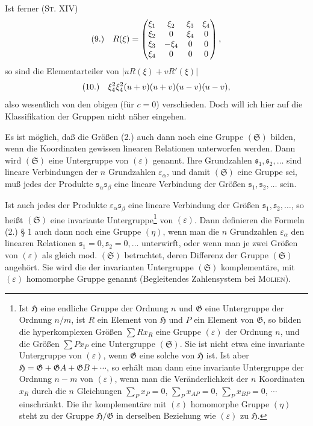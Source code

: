 \documentclass[11pt]{article}
\newcommand{\eps}{\varepsilon}
\newcommand{\fnum}[1]{\textup{(\ensuremath{#1}.)}\quad}
\begin{document}
Ist ferner (\textsc{St}. XIV)
\[
\fnum{9} R(\xi)=
\begin{pmatrix}
\xi_1&\xi_2&\xi_3&\xi_4\\
\xi_2&0&\xi_4&0\\
\xi_3&-\xi_4&0&0\\
\xi_4&0&0&0
\end{pmatrix},
\]
so sind die Elementarteiler von $|uR(\xi)+vR'(\xi)|$
\[
\fnum{10} \xi_4^2\xi_4^2(u+v)(u+v)(u-v)(u-v),
\]
also wesentlich von den obigen (für $c=0$) verschieden. Doch will ich hier auf die Klassifikation der Gruppen nicht näher eingehen.

Es ist möglich, daß die Größen (2.) auch dann noch eine Gruppe $(\mathfrak S)$ bilden, wenn die Koordinaten gewissen linearen Relationen unterworfen werden. Dann wird $(\mathfrak S)$ eine Untergruppe von $(\eps)$ genannt. Ihre Grundzahlen $\mathfrak s_1,\mathfrak s_2,\ldots$ sind lineare Verbindungen der $n$ Grundzahlen $\eps_\alpha$, und damit $(\mathfrak S)$ eine Gruppe sei, muß jedes der Produkte $\mathfrak s_\alpha\mathfrak s_\beta$ eine lineare Verbindung der Größen $\mathfrak s_1,\mathfrak s_2,\ldots$ sein.

Ist auch jedes der Produkte $\eps_\alpha\mathfrak s_\beta$ eine lineare Verbindung der Größen $\mathfrak s_1,\mathfrak s_2,\ldots$, so heißt $(\mathfrak S)$ eine invariante Untergruppe\footnote{Ist $\mathfrak H$ eine endliche Gruppe der Ordnung $n$ und $\mathfrak G$ eine Untergruppe der Ordnung $n/m$, ist $R$ ein Element von $\mathfrak H$ und $P$ ein Element von $\mathfrak G$, so bilden die hyperkomplexen Größen $\sum R x_R$ eine Gruppe $(\eps)$ der Ordnung $n$, und die Größen $\sum P x_P$ eine Untergruppe $(\mathfrak S)$. Sie ist nicht etwa eine invariante Untergruppe von $(\eps)$, wenn $\mathfrak G$ eine solche von $\mathfrak H$ ist. Ist aber $\mathfrak H=\mathfrak G+\mathfrak G A+\mathfrak G B+\cdots$, so erhält man dann eine invariante Untergruppe der Ordnung $n-m$ von $(\eps)$, wenn man die Veränderlichkeit der $n$ Koordinaten $x_R$ durch die $n$ Gleichungen $\sum_P x_P=0$, $\sum_P x_{AP}=0$, $\sum_P x_{BP}=0$, $\cdots$ einschränkt. Die ihr komplementäre mit $(\eps)$ homomorphe Gruppe $(\eta)$ steht zu der Gruppe $\mathfrak H/\mathfrak G$ in derselben Beziehung wie $(\eps)$ zu $\mathfrak H$.} von $(\eps)$. Dann definieren die Formeln (2.) § 1 auch dann noch eine Gruppe $(\eta)$, wenn man die $n$ Grundzahlen $\eps_\alpha$ den linearen Relationen $\mathfrak s_1=0,\mathfrak s_2=0,\ldots$ unterwirft, oder wenn man je zwei Größen von $(\eps)$ als gleich mod. $(\mathfrak S)$ betrachtet, deren Differenz der Gruppe $(\mathfrak S)$ angehört. Sie wird die der invarianten Untergruppe $(\mathfrak S)$ komplementäre, mit $(\eps)$ homomorphe Gruppe genannt (Begleitendes Zahlensystem bei \textsc{Molien}).
\end{document}
